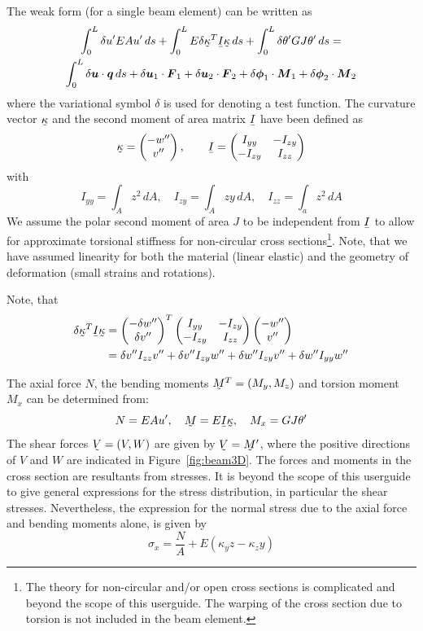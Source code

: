 The weak form (for a single beam element) can be written as
\begin{multline*}
\int_0^L \delta u'EAu'\,ds + \int_0^L E \delta\col\kappa^T\mat I\col\kappa\,ds
+ \int_0^L \delta\theta'GJ\theta'\,ds =\\
\int_0^L\delta\vek u\cdot\vek q\,ds
+\delta\vek u_1\cdot \vek F_1
+\delta\vek u_2\cdot \vek F_2
+\delta\vek\phi_1 \cdot\vek M_1+\delta\vek\phi_2 \cdot\vek M_2 
\end{multline*}
where the variational symbol $\delta$ is used for denoting a test function. 
The curvature vector $\col\kappa$ and the second moment of area matrix $\mat I$ have been defined as
\[
\col\kappa=
\begin{pmatrix}
  -w''\\
  v''
\end{pmatrix},\quad
\quad \mat I=
\begin{pmatrix}
  I_{yy} & -I_{zy} \\
  -I_{zy} & I_{zz} 
\end{pmatrix}
\]
with
\[
   I_{yy} = \int_A z^2\,dA,\quad I_{zy}=\int_A zy\,dA,\quad I_{zz}=\int_a z^2\,dA 
\]
We assume the polar second moment of area $J$ to be independent from $\mat I$ to allow for approximate torsional stiffness for non-circular cross sections\footnote{The theory for non-circular and/or open cross sections is complicated and beyond the scope of this userguide. The warping of the cross section due to torsion is not included in the beam element.}.
Note, that we have assumed linearity for both the material (linear elastic) and
the geometry of deformation (small strains and rotations).

Note, that 
\[
\begin{split} 
\delta\col\kappa^T\mat I\col\kappa
&=
\begin{pmatrix}
  -\delta w''\\
  \delta v''
\end{pmatrix}^T
\begin{pmatrix}
  I_{yy} & -I_{zy} \\
  -I_{zy} & I_{zz} 
\end{pmatrix}
\begin{pmatrix}
  -w'' \\
  v''
\end{pmatrix}\\
&=\delta v''I_{zz}v''+\delta v''I_{zy}w''+\delta w''I_{zy}v''+\delta w''I_{yy}w''
\end{split}
\]

The axial force $N$, the bending moments $\col M^T=(M_y,M_z)$ and torsion moment $M_x$ can be determined from:
\[
    N=EAu',\quad \col M=E\mat I\col\kappa,\quad M_x=GJ\theta'
\]
The shear forces $\col V=(V,W)$ are given by $\col V=\col M'$, where the positive directions of $V$ and $W$ are indicated in Figure~\ref{fig:beam3D}. The forces and moments in the cross section are resultants from stresses. It is beyond the scope of this userguide to give general expressions for the stress distribution, in particular the shear stresses. Nevertheless, the expression for the normal stress due to the axial force and bending moments alone, is given by
\[
  \sigma_x=\dfrac{N}{A}+E(\kappa_y z-\kappa_z y)
\]

